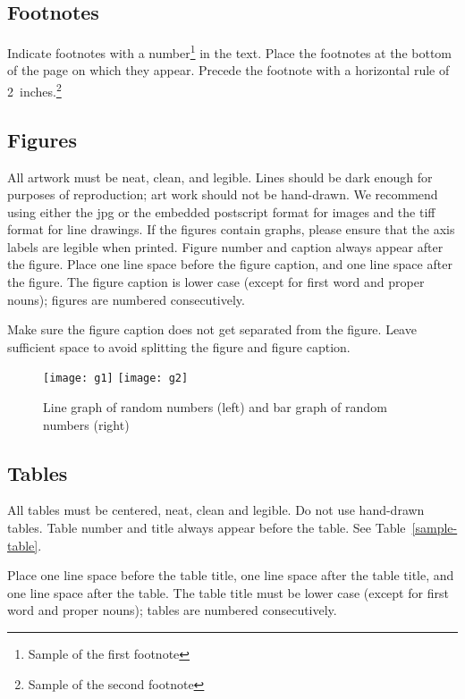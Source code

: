 \documentclass{article}
\begin{document}
\subsection{Footnotes}

Indicate footnotes with a number\footnote{Sample of the first
footnote} in the text. Place the footnotes at the bottom of the page
on which they appear. Precede the footnote with a horizontal rule of
2~inches.\footnote{Sample of the second footnote}

\subsection{Figures}

All artwork must be neat, clean, and legible. Lines should be dark
enough for purposes of reproduction; art work should not be
hand-drawn. We recommend using either the jpg or the embedded
postscript format for images and the tiff format for line drawings.
If the figures contain graphs, please ensure that the axis labels
are legible when printed. Figure number and caption always appear
after the figure. Place one line space before the figure caption,
and one line space after the figure. The figure caption is lower
case (except for first word and proper nouns); figures are numbered
consecutively.

Make sure the figure caption does not get separated from the figure.
Leave sufficient space to avoid splitting the figure and figure caption.

\begin{figure} [h]
    \centering
    \texttt{[image: g1]}
    \hspace{.2in}
    \texttt{[image: g2]}
    \caption{Line graph of random numbers (left) and bar graph of random numbers (right)}
    \label{fig:sampleFigure}
\end{figure}

\subsection{Tables}

All tables must be centered, neat, clean and legible. Do not use hand-drawn
tables. Table number and title always appear before the table. See
Table~\ref{sample-table}.

Place one line space before the table title, one line space after the table
title, and one line space after the table. The table title must be lower case
(except for first word and proper nouns); tables are numbered consecutively.
\end{document}
